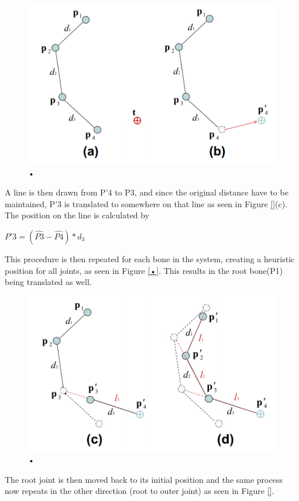 \begin{figure}[hbtp]
\centering
\includegraphics[scale=1]{ab.PNG}
\caption{•}
\end{figure}

A line is then drawn from P'4 to P3, and since the original distance have to be maintained, P'3 is translated to somewhere on that line as seen in Figure \ref{}(c). The position on the line is calculated by 

$P'3 = (\hat{P3} - \hat{P4}) * d_{3}$

This procedure is then repeated for each bone in the system, creating a heuristic position for all joints, as seen in Figure \ref{•}. This results in the root bone(P1) being translated as well. 

\begin{figure}[hbtp]
\centering
\includegraphics[scale=1]{cd.PNG}
\caption{•}
\end{figure}

The root joint is then moved back to its initial position and the same process now repeats in the other direction (root to outer joint) as seen in Figure \ref{}.

